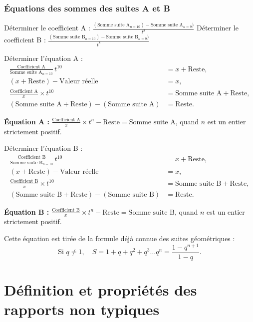 \documentclass[11pt,a4paper]{article}
\begin{document}
\subsubsection{Équations des sommes des suites A et B}

Déterminer le coefficient A :
$\displaystyle \frac{(\text{Somme suite A}_{n=10}) - \text{Somme suite A}_{n=9})}{t^{8}}$ \quad
Déterminer le coefficient B :
$\displaystyle \frac{(\text{Somme suite B}_{n=10}) - \text{Somme suite B}_{n=9})}{t^{8}}$

Déterminer l'équation A :
\begin{align*}
\frac{\text{Coefficient A}}{\text{Somme suite A}_{n=10}}\,t^{10}
&=x+\text{Reste},\\
(x+\text{Reste})-\text{Valeur réelle}&=x,\\
\frac{\text{Coefficient A}}{x}\times t^{10}
&=\text{Somme suite A}+\text{Reste},\\
(\text{Somme suite A}+\text{Reste})-(\text{Somme suite A})
&=\text{Reste}.
\end{align*}

\textbf{Équation A :} $\displaystyle \frac{\text{Coefficient A}}{x} \times t^{n} - \text{Reste} = \text{Somme suite A}$,
quand $n$ est un entier strictement positif.

Déterminer l'équation B :
\begin{align*}
\frac{\text{Coefficient B}}{\text{Somme suite B}_{n=10}}\,t^{10}
&=x+\text{Reste},\\
(x+\text{Reste})-\text{Valeur réelle}&=x,\\
\frac{\text{Coefficient B}}{x}\times t^{10}
&=\text{Somme suite B}+\text{Reste},\\
(\text{Somme suite B}+\text{Reste})-(\text{Somme suite B})
&=\text{Reste}.
\end{align*}

\textbf{Équation B :} $\displaystyle \frac{\text{Coefficient B}}{x} \times t^{n} - \text{Reste} = \text{Somme suite B}$,
quand $n$ est un entier strictement positif.

\vspace{0.3cm}
\begin{boitenote}[Inspiration]
Cette équation est tirée de la formule déjà connue des suites géométriques :
\[
\text{Si } q \neq 1,\quad S = 1 + q + q^{2} + q^{3} \dots q^{n} = \frac{1 - q^{n+1}}{1 - q}.
\]
\end{boitenote}


\section{Définition et propriétés des rapports non typiques}
\end{document}
